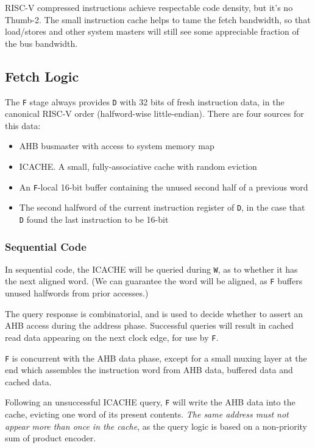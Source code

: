 \documentclass{article}
\begin{document}
RISC-V compressed instructions achieve respectable code density, but it's no Thumb-2. The small instruction cache helps to tame the fetch bandwidth, so that load/stores and other system masters will still see some appreciable fraction of the bus bandwidth.

\subsection{Fetch Logic}

The \texttt{F} stage always provides \texttt{D} with 32 bits of fresh instruction data, in the canonical RISC-V order (halfword-wise little-endian). There are four sources for this data:

\begin{itemize}
\item AHB busmaster with access to system memory map
\item ICACHE. A small, fully-associative cache with random eviction
\item An \texttt{F}-local 16-bit buffer containing the unused second half of a previous word
\item The second halfword of the current instruction register of \texttt{D}, in the case that \texttt{D} found the last instruction to be 16-bit
\end{itemize}

\subsubsection {Sequential Code}
In sequential code, the ICACHE will be queried during \texttt{W}, as to whether it has the next aligned word. (We can guarantee the word will be aligned, as \texttt{F} buffers unused halfwords from prior accesses.)

The query response is combinatorial, and is used to decide whether to assert an AHB access during the address phase. Successful queries will result in cached read data appearing on the next clock edge, for use by \texttt{F}.

\texttt{F} is concurrent with the AHB data phase, except for a small muxing layer at the end which assembles the instruction word from AHB data, buffered data and cached data.

Following an unsuccessful ICACHE query, \texttt{F} will write the AHB data into the cache, evicting one word of its present contents. \textit{The same address must not appear more than once in the cache}, as the query logic is based on a non-priority sum of product encoder.
\end{document}
